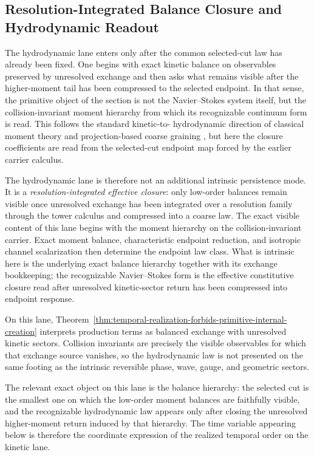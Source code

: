 \subsection{Resolution-Integrated Balance Closure and Hydrodynamic Readout}
\label{sec:flagship-hydrodynamics}

The hydrodynamic lane enters only after the common selected-cut law has
already been fixed. One begins with exact kinetic balance on observables
preserved by unresolved exchange and then asks what remains visible after the
higher-moment tail has been compressed to the selected endpoint. In that
sense, the primitive object of the section is not the Navier--Stokes system
itself, but the collision-invariant moment hierarchy from which its
recognizable continuum form is read. This follows the standard kinetic-to-
hydrodynamic direction of classical moment theory and projection-based
coarse graining
\cite{ChapmanCowling1970,Cercignani1988,Zwanzig1961,ChorinHaldKupferman2000},
but here the closure coefficients are read from the selected-cut endpoint map
forced by the earlier carrier calculus.

The hydrodynamic lane is therefore not an additional intrinsic persistence
mode. It is a \emph{resolution-integrated effective closure}: only low-order
balances remain visible once unresolved exchange has been integrated over a
resolution family through the tower calculus and compressed into a coarse law.
The exact visible content of this lane begins with the moment hierarchy on the
collision-invariant carrier. Exact moment balance, characteristic endpoint
reduction, and isotropic channel scalarization then determine the endpoint law
class. What is intrinsic here is the underlying exact balance hierarchy
together with its exchange bookkeeping; the recognizable Navier--Stokes form
is the effective constitutive closure read after unresolved kinetic-sector
return has been compressed into endpoint response.

On this lane,
Theorem~\ref{thm:temporal-realization-forbids-primitive-internal-creation}
interprets production terms as balanced exchange with unresolved kinetic
sectors. Collision invariants are precisely the visible observables for which
that exchange source vanishes, so the hydrodynamic law is not presented on the
same footing as the intrinsic reversible phase, wave, gauge, and geometric
sectors.

The relevant exact object on this lane is the balance hierarchy: the selected
cut is the smallest one on which the low-order moment balances are faithfully
visible, and the recognizable hydrodynamic law appears only after closing the
unresolved higher-moment return induced by that hierarchy. The time variable
appearing below is therefore the coordinate expression of the realized
temporal order on the kinetic lane.

